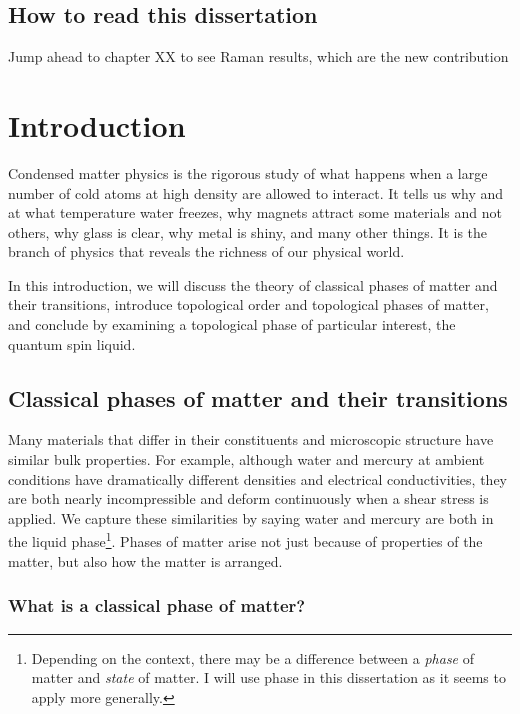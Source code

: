 \section*{How to read this dissertation}

Jump ahead to chapter XX to see Raman results, which are the new contribution

\chapter{Introduction}
Condensed matter physics is the rigorous study of what happens when a large number of cold atoms at high density are allowed to interact. It tells us why and at what temperature water freezes, why magnets attract some materials and not others, why glass is clear, why metal is shiny, and many other things. It is the branch of physics that reveals the richness of our physical world.

In this introduction, we will discuss the theory of classical phases of matter and their transitions, introduce topological order and topological phases of matter, and conclude by examining a topological phase of particular interest, the quantum spin liquid.

\section{Classical phases of matter and their transitions}
Many materials that differ in their constituents and microscopic structure have similar bulk properties. For example, although water and mercury at ambient conditions have dramatically different densities and electrical conductivities, they are both nearly incompressible and deform continuously when a shear stress is applied. We capture these similarities by saying water and mercury are both in the liquid phase\footnote{Depending on the context, there may be a difference between a \textit{phase} of matter and \textit{state} of matter. I will use phase in this dissertation as it seems to apply more generally.}. Phases of matter arise not just because of properties of the matter, but also how the matter is arranged.

\subsection{What is a classical phase of matter?}

